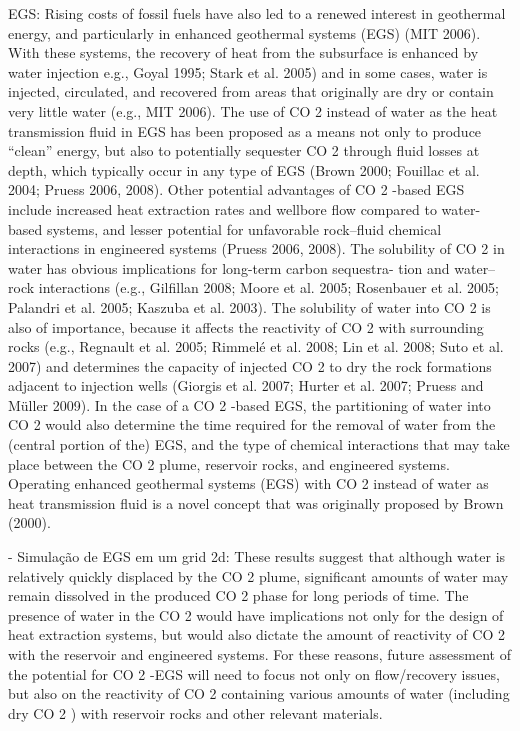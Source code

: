 EGS: Rising costs of fossil fuels have also led to a renewed interest in
geothermal energy, and particularly in enhanced geothermal systems (EGS) (MIT 2006). With these systems, the recovery of heat from the subsurface is enhanced by water injection e.g., Goyal 1995; Stark et al. 2005) and in some cases, water is injected, circulated, and recovered from areas that originally are dry or contain very little water (e.g., MIT 2006). The
use of CO 2 instead of water as the heat transmission fluid in EGS has been proposed as a means not only to produce “clean” energy, but also to potentially sequester CO 2 through fluid losses at depth, which typically occur in any type of EGS (Brown 2000; Fouillac et al. 2004;
Pruess 2006, 2008). Other potential advantages of CO 2 -based EGS include increased heat extraction rates and wellbore flow compared to water-based systems, and lesser potential for unfavorable rock–fluid chemical interactions in engineered systems (Pruess 2006, 2008). The solubility of CO 2 in water has obvious implications for long-term carbon sequestra-
tion and water–rock interactions (e.g., Gilfillan 2008; Moore et al. 2005; Rosenbauer et al. 2005; Palandri et al. 2005; Kaszuba et al. 2003). The solubility of water into CO 2 is also of importance, because it affects the reactivity of CO 2 with surrounding rocks (e.g., Regnault et al. 2005; Rimmelé et al. 2008; Lin et al. 2008; Suto et al. 2007) and determines the capacity of injected CO 2 to dry the rock formations adjacent to injection wells (Giorgis et al. 2007; Hurter et al. 2007; Pruess and Müller 2009). In the case of a CO 2 -based EGS, the partitioning of water into CO 2 would also determine the time required for the removal of water from the (central portion of the) EGS, and the type of chemical interactions that may take
place between the CO 2 plume, reservoir rocks, and engineered systems. Operating enhanced geothermal systems (EGS) with CO 2 instead of water as heat transmission fluid is a novel concept that was originally proposed by Brown (2000).

- Simulação de EGS em um grid 2d: These results suggest that although water is relatively quickly displaced by the CO 2 plume, significant amounts of water may remain dissolved in the produced CO 2 phase for long periods of time. The presence of water in the CO 2 would have implications not only
for the design of heat extraction systems, but would also dictate the amount of reactivity of CO 2 with the reservoir and engineered systems. For these reasons, future assessment of the potential for CO 2 -EGS will need to focus not only on flow/recovery issues, but also on the reactivity of CO 2 containing various amounts of water (including dry CO 2 ) with reservoir
rocks and other relevant materials.




